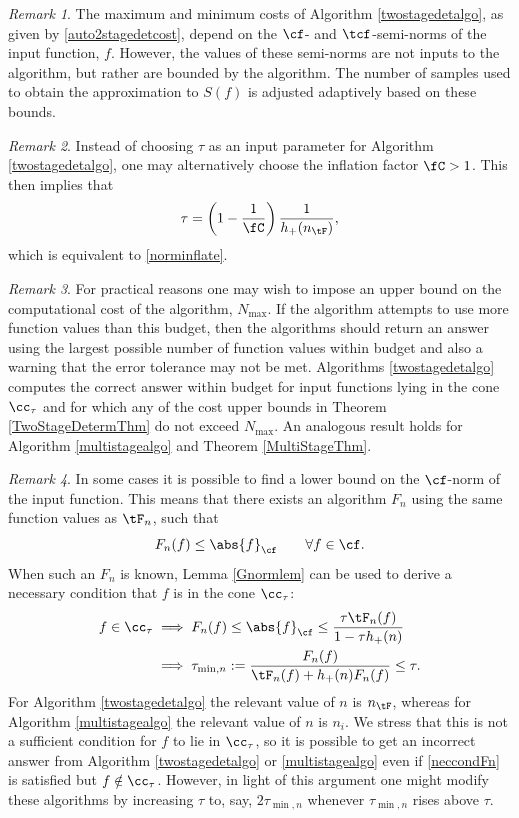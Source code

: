 \documentclass[]{elsarticle}
\theoremstyle{definition}
\theoremstyle{remark}
\newtheorem{rem}{Remark}
\newcommand{\Fnorm}[1]{\abs{#1}_{\cf}}
\begin{document}
\begin{rem} The maximum and minimum costs of Algorithm \ref{twostagedetalgo}, as given by \eqref{auto2stagedetcost}, depend on the $\cf$- and $\tcf$-semi-norms of the input function, $f$.  However, the values of these semi-norms are not inputs to the algorithm, but rather are bounded by the algorithm.  The number of samples used to obtain the approximation to $S(f)$ is adjusted adaptively based on these bounds.
\end{rem}

\begin{rem} Instead of choosing $\tau$ as an input parameter for Algorithm \ref{twostagedetalgo}, one may alternatively choose the inflation factor $\fC >1$.  This then implies that 
\begin{equation} \label{taufromnC}
\tau = \left(1 - \frac{1}{\fC}\right)\frac{1}{h_{+}(n_{\tF})},
\end{equation}
which is equivalent to \eqref{norminflate}.
\end{rem}

\begin{rem} \label{Nmaxrem}  For practical reasons one may wish to impose an upper bound on the computational cost of the algorithm, $N_{\max}$.  If the algorithm attempts to use more function values than this budget, then the algorithms should return an answer using the largest possible number of function values within budget and also a warning that the error tolerance may not be met.  Algorithms \ref{twostagedetalgo} computes the correct answer within  budget for input functions lying in the cone $\cc_{\tau}$ and for which any of the cost upper bounds in Theorem \ref{TwoStageDetermThm} do not exceed $N_{\max}$.  An analogous result holds for Algorithm \ref{multistagealgo} and Theorem \ref{MultiStageThm}.
\end{rem}

\begin{rem} \label{neccondrem} In some cases it is possible to find a lower bound on the $\cf$-norm of the input function.  This means that there exists an algorithm $F_n$ using the same function values as $\tF_n$, such that
\[
F_n(f) \le \Fnorm{f} \qquad \forall f \in \cf.
\]
When such an $F_n$ is known, Lemma \ref{Gnormlem} can be used to derive a necessary condition that $f$ is in the cone $\cc_\tau$:
\begin{align}
\nonumber
f \in \cc_\tau 
& \implies F_n(f) \le \Fnorm{f} \le \frac{\tau \tF_n(f)}{1-\tau h_+(n)}\\
& \implies \tau_{\min,n}:= \frac{F_n(f)}{\tF_n(f) + h_+(n) F_n(f)} \le \tau.
\label{neccondFn}
\end{align}
For Algorithm \ref{twostagedetalgo} the relevant value of $n$ is $n_{\tF}$, whereas for Algorithm \ref{multistagealgo} the relevant value of $n$ is $n_i$.
We stress that this is not a sufficient condition for $f$ to lie in $\cc_{\tau}$, so it is possible to get an incorrect answer from Algorithm \ref{twostagedetalgo} or \ref{multistagealgo} even if \eqref{neccondFn} is satisfied but $f \notin \cc_{\tau}$.  However, in light of this argument one might modify these algorithms by increasing $\tau$ to, say, $2 \tau_{\min,n}$ whenever  $\tau_{\min,n}$ rises above $\tau$. 
\end{rem}
\end{document}
